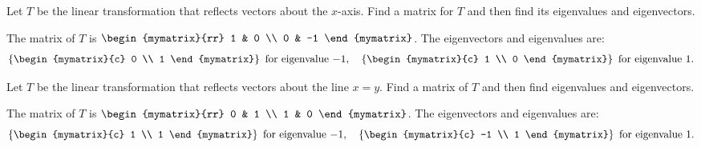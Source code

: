 \begin{ex}
  Let $T$ be the linear transformation that reflects vectors about
  the $x$-axis. Find a matrix for $T$ and then find its eigenvalues and
  eigenvectors.
  \begin{sol}
    The matrix of $T$ is $\begin{mymatrix}{rr}
      1 & 0 \\
      0 & -1
    \end{mymatrix}$. The eigenvectors and eigenvalues are:
    \begin{equation*}
      \set{\begin{mymatrix}{c}
          0 \\
          1
        \end{mymatrix}} ~\mbox{for eigenvalue}~ {-1},
      \quad\set{\begin{mymatrix}{c}
          1 \\
          0
        \end{mymatrix}} ~\mbox{for eigenvalue}~ {1}.
    \end{equation*}
  \end{sol}
\end{ex}

\begin{ex}
  Let $T$ be the linear transformation that reflects vectors about the
  line $x=y$. Find a matrix of $T$ and then find eigenvalues and
  eigenvectors.
  \begin{sol}
    The matrix of $T$ is $\begin{mymatrix}{rr}
      0 & 1 \\
      1 & 0
    \end{mymatrix}$. The eigenvectors and eigenvalues are:
    \begin{equation*}
      \set{\begin{mymatrix}{c}
          1 \\
          1
        \end{mymatrix}} ~\mbox{for eigenvalue}~ {-1},
      \quad\set{\begin{mymatrix}{c}
          -1 \\
          1
        \end{mymatrix}} ~\mbox{for eigenvalue}~ {1}.
    \end{equation*}
  \end{sol}
\end{ex}

